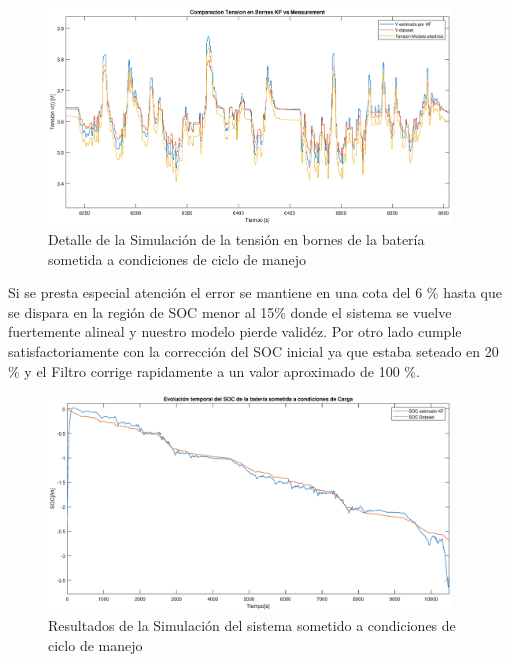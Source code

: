 \documentclass[10pt,a4paper]{article}
\begin{document}
\begin{figure}[h!]
    \begin{center}
	\includegraphics[width=0.95\textwidth]{Tension_Sim_zoom.eps}
	\caption{Detalle de la Simulación de la tensión en bornes de la batería
	sometida a condiciones de ciclo de manejo}
	\label{Tension_sim_zoom}
    \end{center}
\end{figure}

Si se presta especial atención el error se mantiene en una cota del 6 \% hasta
que se dispara en la región de SOC menor al 15\% donde el sistema se vuelve
fuertemente alineal y nuestro modelo pierde validéz. Por otro lado cumple
satisfactoriamente con la corrección del SOC inicial ya que estaba seteado en 20
\% y el Filtro corrige rapidamente a un valor aproximado de 100 \%. 

\begin{figure}[h!]
    \begin{center}
	\includegraphics[width=0.95\textwidth]{Drive_Cycle_1_sim.eps}
	\caption{Resultados de la Simulación del sistema sometido a condiciones de
	ciclo de manejo}
	\label{Drive_Cycle_1_SOC_sim}
    \end{center}
\end{figure}
\end{document}
